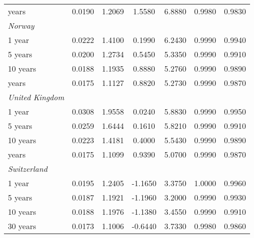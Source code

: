 \documentclass{article}
\begin{document}
\begin{table}[ht]
\begin{tabular}{l c c c c c c}
\medskip													
30 years	&	0.0190	&	1.2069	&	1.5580	&	6.8880	&	0.9980	&	0.9830	\\
\textit{Norway}	&		&		&		&		&		&		\\
1 year	&	0.0222	&	1.4100	&	0.1990	&	6.2430	&	0.9990	&	0.9940	\\
5 years	&	0.0200	&	1.2734	&	0.5450	&	5.3350	&	0.9990	&	0.9910	\\
10 years	&	0.0188	&	1.1935	&	0.8880	&	5.2760	&	0.9990	&	0.9890	\\
\medskip													
30 years	&	0.0175	&	1.1127	&	0.8820	&	5.2730	&	0.9990	&	0.9870	\\
\textit{United Kingdom}	&		&		&		&		&		&		\\
1 year	&	0.0308	&	1.9558	&	0.0240	&	5.8830	&	0.9990	&	0.9950	\\
5 years	&	0.0259	&	1.6444	&	0.1610	&	5.8210	&	0.9990	&	0.9910	\\
10 years	&	0.0223	&	1.4181	&	0.4000	&	5.5430	&	0.9990	&	0.9890	\\
\medskip													
30 years	&	0.0175	&	1.1099	&	0.9390	&	5.0700	&	0.9990	&	0.9870	\\
\textit{Switzerland}	&		&		&		&		&		&		\\
1 year	&	0.0195	&	1.2405	&	-1.1650	&	3.3750	&	1.0000	&	0.9960	\\
5 years	&	0.0187	&	1.1921	&	-1.1960	&	3.2000	&	0.9990	&	0.9930	\\
10 years	&	0.0188	&	1.1976	&	-1.1380	&	3.4550	&	0.9990	&	0.9910	\\
30 years	&	0.0173	&	1.1006	&	-0.6440	&	3.7330	&	0.9980	&	0.9860	\\

\hline%
\end{tabular}
\label{table:nonlin}%
\end{table}
\end{document}
